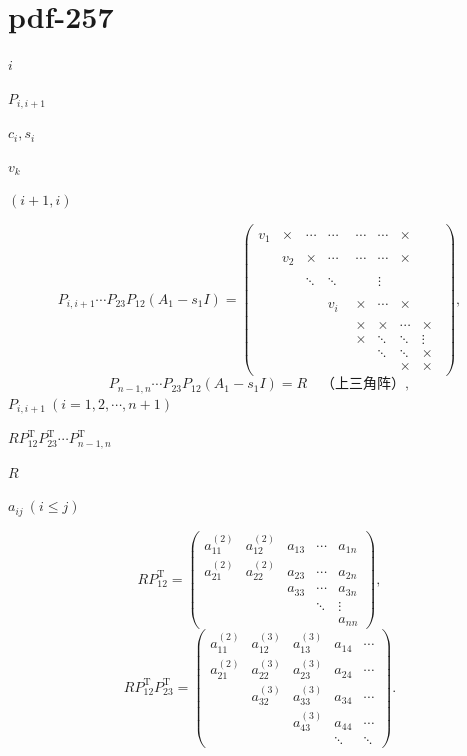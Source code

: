 \documentclass[UTF8,fontset=fandol]{ctexart}
\begin{document}
\section*{pdf-257}
$i$\par
$P_{i,i+1}$\par
$c_i,s_i$\par
$v_k$\par
$(i+1,i)$\par
\[
P_{i,i+1}\cdots P_{23}P_{12}(A_1-s_1I)
=\begin{pmatrix}
v_1&\times&\cdots&\cdots&\begin{matrix}\cdots&\cdots&\times\end{matrix}\\
&v_2&\times&\cdots&\begin{matrix}\cdots&\cdots&\times\end{matrix}\\
&&\ddots&\ddots&\begin{matrix}&&\vdots\end{matrix}\\
&&&v_i&\begin{matrix}\times&\cdots&\times\end{matrix}\\
&&&&\boxed{\begin{matrix}
\times&\times&\cdots&\times\\
\times&\ddots&\ddots&\vdots\\
&\ddots&\ddots&\times\\
&&\times&\times
\end{matrix}}
\end{pmatrix},
\]
\[
P_{n-1,n}\cdots P_{23}P_{12}(A_1-s_1I)=R\quad\text{（上三角阵）},
\]
$P_{i,i+1}\ (i=1,2,\cdots,n+1)$\par
$RP_{12}^{\mathrm T}P_{23}^{\mathrm T}\cdots P_{n-1,n}^{\mathrm T}$\par
$R$\par
$a_{ij}\ (i\leq j)$\par
\[
RP_{12}^{\mathrm T}=\begin{pmatrix}
a_{11}^{(2)}&a_{12}^{(2)}&a_{13}&\cdots&a_{1n}\\
a_{21}^{(2)}&a_{22}^{(2)}&a_{23}&\cdots&a_{2n}\\
&&a_{33}&\cdots&a_{3n}\\
&&&\ddots&\vdots\\
&&&&a_{nn}
\end{pmatrix},
\]
\[
RP_{12}^{\mathrm T}P_{23}^{\mathrm T}=\begin{pmatrix}
a_{11}^{(2)}&a_{12}^{(3)}&a_{13}^{(3)}&a_{14}&\cdots\\
a_{21}^{(2)}&a_{22}^{(3)}&a_{23}^{(3)}&a_{24}&\cdots\\
&a_{32}^{(3)}&a_{33}^{(3)}&a_{34}&\cdots\\
&&a_{43}^{(3)}&a_{44}&\cdots\\
&&&\ddots&\ddots
\end{pmatrix}.
\]
\end{document}
